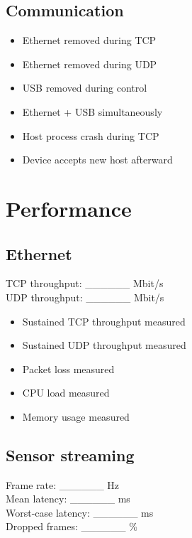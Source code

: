 \documentclass[10pt,a4paper,oneside]{report}
\providecommand{\tightlist}{\setlength{\itemsep}{1pt}\setlength{\parskip}{1pt}}
\begin{document}
\subsection{Communication}\label{wiki-hardware-bring-up-and-testing--communication}

\begin{itemize}
\tightlist
\item[$\square$]
  Ethernet removed during TCP
\item[$\square$]
  Ethernet removed during UDP
\item[$\square$]
  USB removed during control
\item[$\square$]
  Ethernet + USB simultaneously
\item[$\square$]
  Host process crash during TCP
\item[$\square$]
  Device accepts new host afterward
\end{itemize}

\section{Performance}\label{wiki-hardware-bring-up-and-testing--21-performance}

\subsection{Ethernet}\label{wiki-hardware-bring-up-and-testing--ethernet}

TCP throughput: \_\_\_\_\_\_ Mbit/s\\
UDP throughput: \_\_\_\_\_\_ Mbit/s

\begin{itemize}
\tightlist
\item[$\square$]
  Sustained TCP throughput measured
\item[$\square$]
  Sustained UDP throughput measured
\item[$\square$]
  Packet loss measured
\item[$\square$]
  CPU load measured
\item[$\square$]
  Memory usage measured
\end{itemize}

\subsection{Sensor streaming}\label{wiki-hardware-bring-up-and-testing--sensor-streaming}

Frame rate: \_\_\_\_\_\_ Hz\\
Mean latency: \_\_\_\_\_\_ ms\\
Worst-case latency: \_\_\_\_\_\_ ms\\
Dropped frames: \_\_\_\_\_\_ \%
\end{document}
